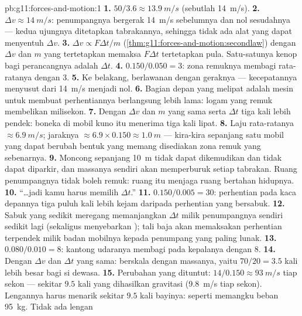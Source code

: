 \begin{solution}{pb:g11:forces-and-motion:1}
\textbf{1.} $50/3.6 \approx \qty{13.9}{m/s}$ (sebutlah \qty{14}{m/s}).
\textbf{2.} $\Delta v \approx \qty{14}{m/s}$: penumpangnya bergerak
\qty{14}{m/s} sebelumnya dan nol sesudahnya --- kedua ujungnya
ditetapkan tabrakannya, sehingga tidak ada alat yang dapat menyentuh
$\Delta v$.
\textbf{3.} $\Delta v \propto F\Delta t/m$
(\cref{thm:g11:forces-and-motion:secondlaw}) dengan $\Delta v$ dan $m$
yang tertetapkan memaksa $F\Delta t$ tertetapkan pula. Satu-satunya
kenop bagi perancangnya adalah $\Delta t$.
\textbf{4.} $0.150/0.050 = 3$: zona remuknya membagi  rata-ratanya
dengan $3$.
\textbf{5.} Ke belakang, berlawanan dengan geraknya --- kecepatannya
menyusut dari \qty{14}{m/s} menjadi nol.
\textbf{6.} Bagian depan yang melipat adalah mesin untuk membuat
perhentiannya berlangsung lebih lama: logam yang remuk membelikan
milisekon.
\textbf{7.} Dengan $\Delta v$ dan $m$ yang sama serta $\Delta t$ tiga
kali lebih pendek: boneka di mobil kuno itu menerima  tiga kali
lipat.
\textbf{8.} Laju rata-ratanya $\approx \qty{6.9}{m/s}$; jaraknya
$\approx
6.9 \times 0.150 \approx \qty{1.0}{m}$ --- kira-kira sepanjang
satu  mobil yang dapat berubah bentuk yang memang disediakan zona
remuk yang sebenarnya.
\textbf{9.} Moncong sepanjang \qty{10}{m} tidak dapat dikemudikan dan
tidak dapat diparkir, dan massanya sendiri akan memperburuk setiap
tabrakan. Ruang penumpangnya tidak boleh remuk: ruang itu menjaga
ruang bertahan hidupnya.
\textbf{10.} ``\dots jadi kamu harus memilih $\Delta t$.''
\textbf{11.} $0.150/0.005 = 30$: perhentian pada kaca depannya tiga
puluh kali lebih kejam daripada perhentian yang bersabuk.
\textbf{12.} Sabuk yang sedikit meregang memanjangkan $\Delta t$ milik
penumpangnya sendiri sedikit lagi (sekaligus menyebarkan ); tali
baja akan memaksakan perhentian terpendek milik badan mobilnya kepada
penumpang yang paling lunak.
\textbf{13.} $0.080/0.010 = 8$: kantong udaranya membagi  pada
kepalanya dengan $8$.
\textbf{14.} Dengan $\Delta v$ dan $\Delta t$ yang sama: 
berskala dengan massanya, yaitu $70/20 = 3.5$ kali lebih besar bagi si
dewasa.
\textbf{15.} Perubahan yang dituntut: $14/0.150 \approx \qty{93}{m/s}$
tiap sekon --- sekitar $9.5$ kali yang dihasilkan gravitasi
(\qty{9.8}{m/s} tiap sekon). Lengannya harus menarik sekitar $9.5$ kali
 bayinya: seperti memangku beban \qty{95}{kg}. Tidak ada lengan

\end{solution}
